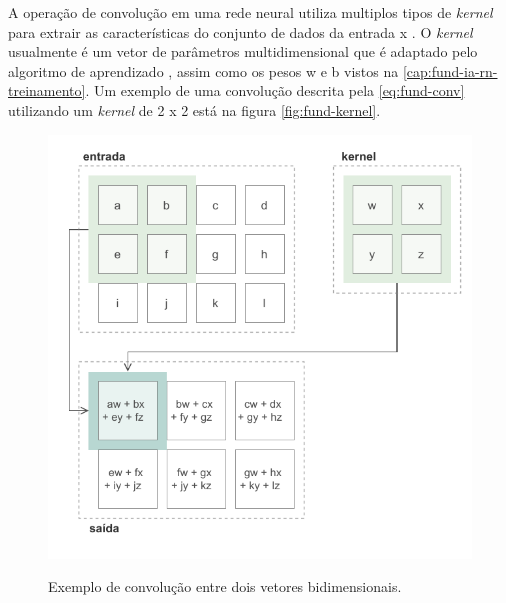 A operação de convolução em uma rede neural utiliza multiplos tipos de \textit{kernel} para extrair as características do conjunto de dados da entrada x \cite{ref:Eden-Ierapetritou-Towler}. O \textit{kernel} usualmente é um vetor de parâmetros multidimensional que é adaptado pelo algoritmo de aprendizado \cite{ref:Goodfellow-Bengio-Courville}, assim como os pesos w e b vistos na \autoref{cap:fund-ia-rn-treinamento}. Um exemplo de uma convolução descrita pela \autoref{eq:fund-conv} utilizando um \textit{kernel} de 2 x 2 está na figura \autoref{fig:fund-kernel}.

\begin{figure}[h!] %
  \centering
  \caption{Exemplo de convolução entre dois vetores bidimensionais.}
  \includegraphics[scale=1.1]{img/img-fundamentacao-kernel.pdf}
  \label{fig:fund-kernel}
\end{figure}





